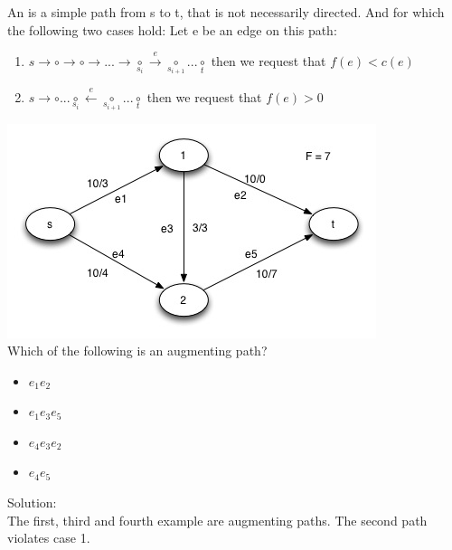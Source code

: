 An  is a simple path from s to t, that is not necessarily directed. And for which the following two cases hold: Let e be an edge on this path: 
\begin{enumerate}
\item $ s \rightarrow \circ \rightarrow \circ \rightarrow ... \rightarrow \underset{s_i}{\circ} \xrightarrow{e} \underset{s_{i+1}}{\circ} ...  \underset{t}{\circ}$ then we request that $f(e) < c(e)$
\item $s \rightarrow \circ ...  \underset{s_i}{\circ} \xleftarrow{e} \underset{s_{i+1}}{\circ} ... \underset{t}{\circ}$ then we request that $f(e) > 0$
\end{enumerate}

\begin{example}
\includegraphics{diagrams/Chapter3_Example2.jpg} \\
Which of the following is an augmenting path? 
\begin{itemize}
\item $e_1 e_2$
\item $e_1 e_3 e_5$
\item $e_4 e_3 e_2$
\item $e_4 e_5$
\end{itemize}

Solution: \\
The first, third and fourth example are augmenting paths. The second path violates case 1.
\end{example}

